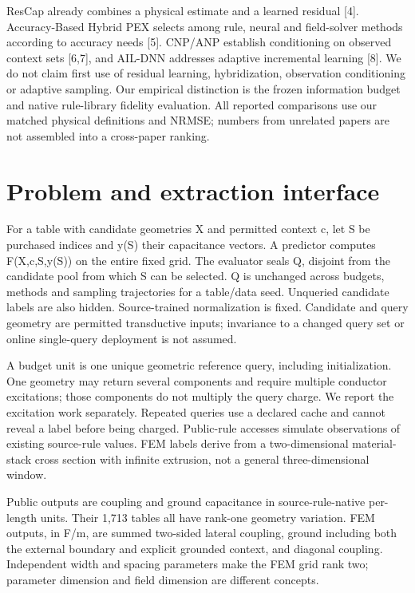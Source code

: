 \documentclass[10pt,twocolumn]{article}
\begin{document}
ResCap already combines a physical estimate and a learned residual [4]. Accuracy-Based Hybrid PEX selects among rule, neural and field-solver methods according to accuracy needs [5]. CNP/ANP establish conditioning on observed context sets [6,7], and AIL-DNN addresses adaptive incremental learning [8]. We do not claim first use of residual learning, hybridization, observation conditioning or adaptive sampling. Our empirical distinction is the frozen information budget and native rule-library fidelity evaluation. All reported comparisons use our matched physical definitions and NRMSE; numbers from unrelated papers are not assembled into a cross-paper ranking.

\section*{Problem and extraction interface}

For a table with candidate geometries X and permitted context c, let S be purchased indices and y(S) their capacitance vectors. A predictor computes F(X,c,S,y(S)) on the entire fixed grid. The evaluator seals Q, disjoint from the candidate pool from which S can be selected. Q is unchanged across budgets, methods and sampling trajectories for a table/data seed. Unqueried candidate labels are also hidden. Source-trained normalization is fixed. Candidate and query geometry are permitted transductive inputs; invariance to a changed query set or online single-query deployment is not assumed.

A budget unit is one unique geometric reference query, including initialization. One geometry may return several components and require multiple conductor excitations; those components do not multiply the query charge. We report the excitation work separately. Repeated queries use a declared cache and cannot reveal a label before being charged. Public-rule accesses simulate observations of existing source-rule values. FEM labels derive from a two-dimensional material-stack cross section with infinite extrusion, not a general three-dimensional window.

Public outputs are coupling and ground capacitance in source-rule-native per-length units. Their 1,713 tables all have rank-one geometry variation. FEM outputs, in F/m, are summed two-sided lateral coupling, ground including both the external boundary and explicit grounded context, and diagonal coupling. Independent width and spacing parameters make the FEM grid rank two; parameter dimension and field dimension are different concepts.
\end{document}
